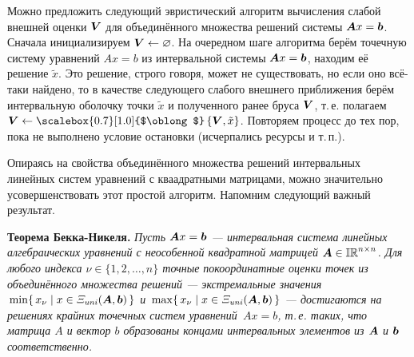 \documentclass[a5paper,openany]{book}
\newcommand{\mbf}[1]{\protect\text{\boldmath$#1$}}
\newcommand{\mbb}{\mathbb}
\newcommand{\Ab}{(\mbf{A}, \mbf{b})}
\newcommand{\USS}{\varXi_\mathit{\hspace{-0.5pt}uni}}
\newcommand{\ih}{\scalebox{0.7}[1.0]{$\oblong$}}
\begin{document}
Можно предложить следующий эвристический алгоритм вычисления слабой внешней оценки 
$\mbf{V}$ для объединённого множества решений системы $\mbf{A}x = \mbf{b}$. Сначала 
инициализируем $\mbf{V}\gets\varnothing$. На очередном шаге алгоритма берём точечную 
систему уравнений $Ax = b$ из интервальной системы $\mbf{A}x = \mbf{b}$, находим её 
решение $\tilde{x}$. Это решение, строго говоря, может не существовать, но если оно 
всё-таки найдено, то в качестве следующего слабого внешнего приближения берём 
интервальную оболочку точки $\tilde{x}$ и полученного ранее бруса $\mbf{V}$, т.\,е. 
полагаем $\mbf{V}\gets\ih\,\{\mbf{V}, \tilde{x}\}$. Повторяем процесс до тех пор, 
пока не выполнено условие остановки (исчерпались ресурсы и т.\,п.). 
    
Опираясь на свойства объединённого множества решений интервальных линейных систем 
уравнений с кваадратными матрицами, можно значительно усовершенствовать этот простой 
алгоритм. Напомним следующий важный результат. 
    
\addvspace{\bigskipamount}\noindent  
\textbf{Теорема Бекка-Никеля.} 
{\sl Пусть $\mbf{A}x = \mbf{b}$ --- интервальная система линейных алгебраических 
уравнений с неособенной квадратной матрицей $\mbf{A}\in \mbb{IR}^{n\times n}$. 
Для любого индекса $\nu\in\{1,2,\ldots,n\}$ точные покоординатные оценки точек 
из объединённого множества решений --- экстремальные значения $\,\min\{\,x_{\nu} 
\mid x\in\USS\Ab\,\}$ и $\,\max\{\,x_{\nu} \mid x\in\USS\Ab\,\}$ --- достигаются 
на решениях крайних точечных систем уравнений $\,Ax = b$, т.\,е. таких, что матрица 
$A$ и вектор $b$ образованы концами интервальных элементов из $\mbf{A}$ и $\mbf{b}$ 
соответственно.}  
  
\bigskip    
  
\end{document}
